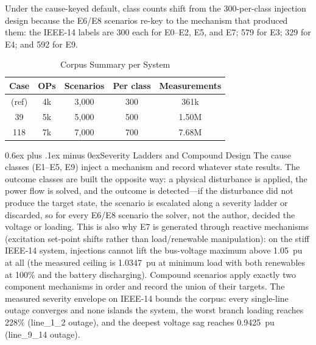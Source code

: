 \documentclass[conference]{IEEEtran}
\makeatletter
\def\subsection{\@startsection{subsection}{2}{\z@}{1.2ex plus 0.2ex minus 0.1ex}%
{0.6ex plus .1ex minus 0ex}{\normalfont\normalsize\itshape}}%
\makeatother
\begin{document}
Under the cause-keyed default, class counts shift from the 300-per-class injection design because the E6/E8 scenarios re-key to the mechanism that produced them: the IEEE-14 labels are 300 each for E0--E2, E5, and E7; 579 for E3; 329 for E4; and 592 for E9.

\begin{table}[!t]
\caption{Corpus Summary per System}
\label{tab:corpus}
\centering
\setlength{\tabcolsep}{3.2pt}
\fontsize{7}{8}\selectfont
\begin{tabular}{|c|c|c|c|c|}
\hline
\fontsize{8}{9}\selectfont\textbf{Case} & \textbf{OPs} & \textbf{Scenarios} & \textbf{Per class} & \textbf{Measurements}\\
\hline
\fontsize{7}{8}\selectfont
14 (ref) & 4k & 3,000 & 300 & 361k\\ \hline
39 & 5k & 5,000 & 500 & 1.50M\\ \hline
118 & 7k & 7,000 & 700 & 7.68M\\ \hline
\end{tabular}
\end{table}

\subsection{Severity Ladders and Compound Design}
The cause classes (E1--E5, E9) inject a mechanism and record whatever state results. The outcome classes are built the opposite way: a physical disturbance is applied, the power flow is solved, and the outcome is detected---if the disturbance did not produce the target state, the scenario is escalated along a severity ladder or discarded, so for every E6/E8 scenario the solver, not the author, decided the voltage or loading. This is also why E7 is generated through reactive mechanisms (excitation set-point shifts rather than load/renewable manipulation): on the stiff IEEE-14 system, injections cannot lift the bus-voltage maximum above 1.05~pu at all (the measured ceiling is 1.0347~pu at minimum load with both renewables at 100\% and the battery discharging). Compound scenarios apply exactly two component mechanisms in order and record the union of their targets. The measured severity envelope on IEEE-14 bounds the corpus: every single-line outage converges and none islands the system, the worst branch loading reaches 228\% (line\_1\_2 outage), and the deepest voltage sag reaches 0.9425~pu (line\_9\_14 outage).
\end{document}
